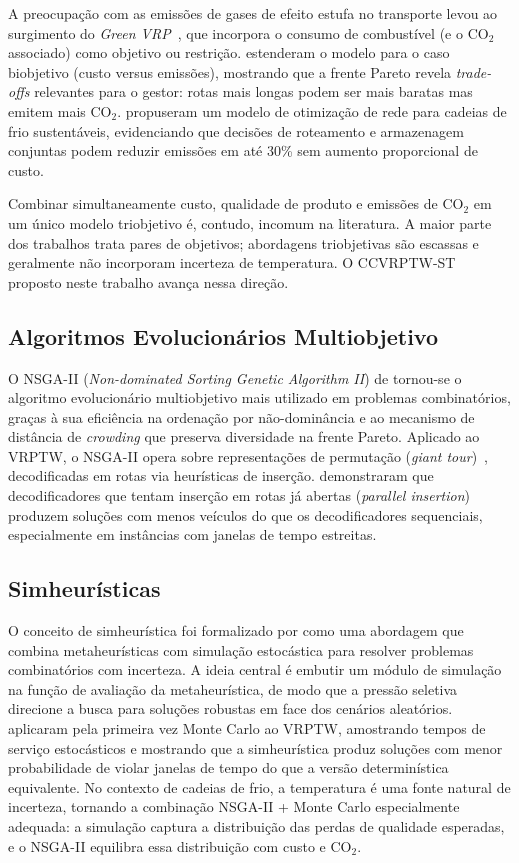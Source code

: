 \documentclass[a4paper,11pt]{article}
\begin{document}
A preocupação com as emissões de gases de efeito estufa no transporte
levou ao surgimento do \textit{Green VRP}~\citep{bektas:2011}, que incorpora
o consumo de combustível (e o CO$_2$ associado) como objetivo ou restrição.
\citet{demir:2014} estenderam o modelo para o caso biobjetivo
(custo versus emissões), mostrando que a frente Pareto revela \textit{trade-offs}
relevantes para o gestor: rotas mais longas podem ser mais baratas mas emitem
mais CO$_2$.
\citet{meneghetti:2021} propuseram um modelo de otimização de rede para
cadeias de frio sustentáveis, evidenciando que decisões de roteamento e
armazenagem conjuntas podem reduzir emissões em até 30\% sem
aumento proporcional de custo.

Combinar simultaneamente custo, qualidade de produto e emissões de CO$_2$
em um único modelo triobjetivo é, contudo, incomum na literatura.
A maior parte dos trabalhos trata pares de objetivos; abordagens triobjetivas
são escassas e geralmente não incorporam incerteza de temperatura.
O CCVRPTW-ST proposto neste trabalho avança nessa direção.

\subsection{Algoritmos Evolucionários Multiobjetivo}

O NSGA-II (\textit{Non-dominated Sorting Genetic Algorithm II}) de
\citet{deb:2002} tornou-se o algoritmo evolucionário multiobjetivo
mais utilizado em problemas combinatórios, graças à sua efici\^encia
na ordenação por não-domin\^ancia e ao mecanismo de dist\^ancia de
\textit{crowding} que preserva diversidade na frente Pareto.
Aplicado ao VRPTW, o NSGA-II opera sobre representações de permutação
(\textit{giant tour})~\citep{potvin:1995}, decodificadas em rotas via
heurísticas de inserção.
\citet{nagata:2009} demonstraram que decodificadores que tentam inserção
em rotas já abertas (\textit{parallel insertion}) produzem soluções
com menos veículos do que os decodificadores sequenciais, especialmente
em inst\^ancias com janelas de tempo estreitas.

\subsection{Simheurísticas}

O conceito de simheurística foi formalizado por \citet{juan:2015} como
uma abordagem que combina metaheurísticas com simulação estocástica
para resolver problemas combinatórios com incerteza.
A ideia central é embutir um módulo de simulação na função de
avaliação da metaheurística, de modo que a pressão seletiva direcione
a busca para soluções robustas em face dos cenários aleatórios.
\citet{juan:2011} aplicaram pela primeira vez Monte Carlo ao VRPTW,
amostrando tempos de serviço estocásticos e mostrando que a
simheurística produz soluções com menor probabilidade de violar
janelas de tempo do que a versão determinística equivalente.
No contexto de cadeias de frio, a temperatura é uma fonte natural de
incerteza, tornando a combinação NSGA-II + Monte Carlo especialmente
adequada: a simulação captura a distribuição das perdas de qualidade
esperadas, e o NSGA-II equilibra essa distribuição com custo e CO$_2$.
\end{document}
